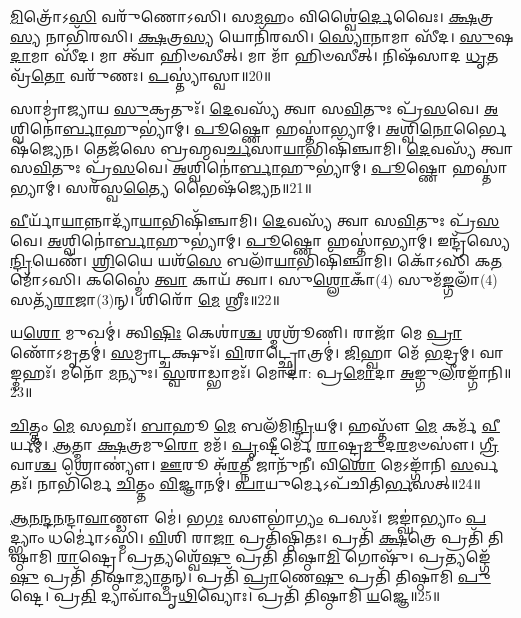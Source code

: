 \-\ul{𑌮𑌿}\-𑌤𑍍𑌰𑍋᳴𑌽\-\ul{𑌸𑌿} 𑌵𑌰𑍁᳴𑌣𑍋𑌽𑌸𑌿।
𑌸\-\ul{𑌮}\-𑌹𑌂 𑌵𑌿𑌶𑍍𑌵𑍈॑\-\ul{𑌰𑍍𑌦𑍇}\-𑌵𑍈𑌃।
\-\ul{𑌕𑍍𑌷}\-𑌤𑍍𑌰\-\ul{𑌸𑍍𑌯} 𑌨𑌾𑌭𑌿᳴𑌰𑌸𑌿।
\-\ul{𑌕𑍍𑌷}\-𑌤𑍍𑌰\-\ul{𑌸𑍍𑌯} 𑌯𑍋𑌨𑌿᳴𑌰𑌸𑌿।
\-\ul{𑌸𑍍𑌯𑍋}\-𑌨𑌾𑌮𑌾 𑌸𑍀᳴𑌦।
\-\ul{𑌸𑍁}\-𑌷\-\ul{𑌦𑌾}\-𑌮𑌾 𑌸𑍀᳴𑌦।
𑌮𑌾 𑌤𑍍𑌵𑌾᳴ 𑌹𑌿𑍞𑌸𑍀𑌤𑍍।
𑌮𑌾 𑌮𑌾᳴ 𑌹𑌿𑍞𑌸𑍀𑌤𑍍।
𑌨𑌿𑌷᳴𑌸𑌾𑌦 \ul{𑌧𑍃}\-𑌤𑌵𑍍𑌰᳴\-\ul{𑌤𑍋} 𑌵𑌰𑍁᳴𑌣𑌃।
\-\ul{𑌪}\-𑌸𑍍𑌤𑍍𑌯𑌾॑𑌸𑍍𑌵𑌾॥20॥

𑌸𑌾𑌮𑍍𑌰𑌾॑𑌜𑍍𑌯𑌾𑌯 \ul{𑌸𑍁}\-𑌕𑍍𑌰𑌤𑍁𑌃᳴।
\-\ul{𑌦𑍇}\-𑌵𑌸𑍍𑌯᳴ 𑌤𑍍𑌵𑌾 𑌸\-\ul{𑌵𑌿}\-𑌤𑍁𑌃 𑌪𑍍𑌰᳴\-\ul{𑌸}\-𑌵𑍇।
\-\ul{𑌅}\-𑌶𑍍𑌵𑌿𑌨𑍋॑\-\ul{𑌰𑍍𑌬𑌾}\-𑌹𑍁𑌭𑍍𑌯𑌾॑𑌮𑍍।
\-\ul{𑌪𑍂}\-𑌷𑍍𑌣𑍋 𑌹𑌸𑍍𑌤𑌾॑𑌭𑍍𑌯𑌾𑌮𑍍।
\-\ul{𑌅}\-𑌶𑍍𑌵𑌿\-\ul{𑌨𑍋}\-𑌰𑍍𑌭𑍈𑌷᳴𑌜𑍍𑌯𑍇𑌨।
𑌤𑍇𑌜᳴𑌸𑍇 𑌬𑍍𑌰𑌹𑍍𑌮𑌵\-\ul{𑌰𑍍𑌚}\-𑌸𑌾\-\ul{𑌯𑌾}\-𑌭𑌿𑌷𑌿᳴𑌞𑍍𑌚𑌾𑌮𑌿।
\-\ul{𑌦𑍇}\-𑌵𑌸𑍍𑌯᳴ 𑌤𑍍𑌵𑌾 𑌸\-\ul{𑌵𑌿}\-𑌤𑍁𑌃 𑌪𑍍𑌰᳴\-\ul{𑌸}\-𑌵𑍇।
\-\ul{𑌅}\-𑌶𑍍𑌵𑌿𑌨𑍋॑\-\ul{𑌰𑍍𑌬𑌾}\-𑌹𑍁𑌭𑍍𑌯𑌾॑𑌮𑍍।
\-\ul{𑌪𑍂}\-𑌷𑍍𑌣𑍋 𑌹𑌸𑍍𑌤𑌾॑𑌭𑍍𑌯𑌾𑌮𑍍।
𑌸𑌰᳴𑌸𑍍𑌵\-\ul{𑌤𑍍𑌯𑍈} 𑌭𑍈𑌷᳴𑌜𑍍𑌯𑍇𑌨॥21॥

\-\ul{𑌵𑍀}\-𑌰𑍍𑌯𑌾᳴\-\ul{𑌯𑌾}\-𑌨𑍍𑌨𑌾𑌦𑍍𑌯𑌾᳴\-\ul{𑌯𑌾}\-𑌭𑌿𑌷𑌿᳴𑌞𑍍𑌚𑌾𑌮𑌿।
\-\ul{𑌦𑍇}\-𑌵𑌸𑍍𑌯᳴ 𑌤𑍍𑌵𑌾 𑌸\-\ul{𑌵𑌿}\-𑌤𑍁𑌃 𑌪𑍍𑌰᳴\-\ul{𑌸}\-𑌵𑍇।
\-\ul{𑌅}\-𑌶𑍍𑌵𑌿𑌨𑍋॑\-\ul{𑌰𑍍𑌬𑌾}\-𑌹𑍁𑌭𑍍𑌯𑌾॑𑌮𑍍।
\-\ul{𑌪𑍂}\-𑌷𑍍𑌣𑍋 𑌹𑌸𑍍𑌤𑌾॑𑌭𑍍𑌯𑌾𑌮𑍍।
𑌇𑌨𑍍𑌦𑍍𑌰᳴𑌸𑍍𑌯𑍇\-\ul{𑌨𑍍𑌦𑍍𑌰𑌿}\-𑌯𑍇𑌣᳴।
\-\ul{𑌶𑍍𑌰𑌿}\-𑌯𑍈 𑌯𑌶᳴\-\ul{𑌸𑍇} 𑌬𑌲𑌾᳴\-\ul{𑌯𑌾}\-𑌭𑌿𑌷𑌿᳴𑌞𑍍𑌚𑌾𑌮𑌿।
𑌕𑍋᳴𑌽𑌸𑌿 𑌕\-\ul{𑌤}\-𑌮𑍋᳴𑌽𑌸𑌿।
𑌕𑌸𑍍𑌮𑍈॑ \ul{𑌤𑍍𑌵𑌾} 𑌕𑌾𑌯᳴ 𑌤𑍍𑌵𑌾।
𑌸𑍁\-\ul{𑌶𑍍𑌲𑍋}\-𑌕𑌾𑌁(4) 𑌸𑍁𑌮᳴\-\ul{𑌙𑍍𑌗}\-𑌲𑌾𑌁(4) 𑌸𑌤𑍍𑌯᳴\-\ul{𑌰𑌾}\-𑌜𑌾(3)𑌨𑍍।
𑌶𑌿𑌰𑍋᳴ \ul{𑌮𑍇} 𑌶𑍍𑌰𑍀𑌃॥22॥

𑌯\-\ul{𑌶𑍋} 𑌮𑍁𑌖𑌮𑍍॑।
𑌤𑍍𑌵𑌿\-\ul{𑌷𑌿𑌃} 𑌕𑍇𑌶𑌾॑\-\ul{𑌶𑍍𑌚} 𑌶𑍍𑌮𑌶𑍍𑌰𑍂᳴𑌣𑌿।
𑌰𑌾𑌜𑌾᳴ 𑌮𑍇 \ul{𑌪𑍍𑌰𑌾}\-𑌣𑍋᳴\-𑌽𑌮𑍃𑌤𑌮𑍍॑।
\-\ul{𑌸}\-𑌮𑍍𑌰𑌾𑌟𑍍𑌚𑌕𑍍𑌷𑍁𑌃᳴।
\-\ul{𑌵𑌿}\-𑌰𑌾𑌟𑍍𑌛𑍍𑌰𑍋𑌤𑍍𑌰𑌮𑍍॑।
\-\ul{𑌜𑌿}\-𑌹𑍍𑌵𑌾 𑌮𑍇᳴ \ul{𑌭}\-𑌦𑍍𑌰𑌮𑍍।
𑌵𑌾𑌙𑍍𑌮𑌹𑌃᳴।
𑌮𑌨𑍋᳴ \ul{𑌮}\-𑌨𑍍𑌯𑍁𑌃।
\-\ul{𑌸𑍍𑌵}\-𑌰𑌾𑌡𑍍𑌭𑌾𑌮𑌃᳴।
𑌮𑍋𑌦𑌾॑: 𑌪𑍍𑌰\-\ul{𑌮𑍋}\-𑌦𑌾 \ul{𑌅}\-𑌙𑍍𑌗𑍁\-\ul{𑌲𑍀}\-𑌰𑌙𑍍𑌗𑌾᳴𑌨𑌿॥23॥

\-\ul{𑌚𑌿}\-𑌤𑍍𑌤𑌂 \ul{𑌮𑍇} 𑌸𑌹𑌃᳴।
\-\ul{𑌬𑌾}\-𑌹𑍂 \ul{𑌮𑍇} 𑌬𑌲᳴𑌮𑌿\-\ul{𑌨𑍍𑌦𑍍𑌰𑌿}\-𑌯𑌮𑍍।
𑌹𑌸𑍍𑌤𑍗᳴ \ul{𑌮𑍇} 𑌕𑌰𑍍𑌮᳴ \ul{𑌵𑍀}\-𑌰𑍍𑌯𑌮𑍍॑।
\-\ul{𑌆}\-𑌤𑍍𑌮𑌾 \ul{𑌕𑍍𑌷}\-𑌤𑍍𑌰𑌮𑍁\-\ul{𑌰𑍋} 𑌮𑌮᳴।
\-\ul{𑌪𑍃}\-𑌷𑍍𑌟𑍀𑌰𑍍𑌮𑍇᳴ \ul{𑌰𑌾}\-𑌷𑍍𑌟𑍍𑌰\-\ul{𑌮𑍁}\-𑌦\-\ul{𑌰}\-𑌮𑍞𑌸𑍗॑।
\-\ul{𑌗𑍍𑌰𑍀}\-𑌵𑌾\-\ul{𑌶𑍍𑌚} 𑌶𑍍𑌰𑍋𑌣𑍍𑌯𑍗॑।
\-\ul{𑌊}\-𑌰𑍂 𑌅᳴\-\ul{𑌰}\-𑌤𑍍𑌨𑍀 𑌜𑌾𑌨𑍁᳴𑌨𑍀।
𑌵𑌿\-\ul{𑌶𑍋} 𑌮𑍇𑌽𑌙𑍍𑌗𑌾᳴𑌨𑌿 \ul{𑌸}\-𑌰𑍍𑌵𑌤𑌃᳴।
𑌨𑌾𑌭𑌿᳴𑌰𑍍𑌮𑍇 \ul{𑌚𑌿}\-𑌤𑍍𑌤𑌂 \ul{𑌵𑌿}\-𑌜𑍍𑌞𑌾𑌨𑌮𑍍॑।
\-\ul{𑌪𑌾}\-𑌯𑍁𑌰𑍍𑌮𑍇\-𑌽𑌪᳴𑌚𑌿𑌤𑌿\-\ul{𑌰𑍍𑌭}\-𑌸𑌤𑍍॥24॥

\-\ul{𑌆}\-\-\ul{𑌨}\-\-\ul{𑌨𑍍𑌦}\-\-\ul{𑌨}\-𑌨𑍍𑌦𑌾\-\ul{𑌵𑌾}\-𑌣𑍍𑌡𑍗 𑌮𑍇॑।
𑌭\-\ul{𑌗𑌃} 𑌸𑍗𑌭𑌾॑\-\ul{𑌗𑍍𑌯𑌂} 𑌪𑌸𑌃᳴।
𑌜𑌙𑍍𑌘𑌾॑𑌭𑍍𑌯𑌾𑌂 \ul{𑌪}\-𑌦𑍍𑌭𑍍𑌯𑌾𑌂 𑌧𑌰𑍍𑌮𑍋॑\-𑌽𑌸𑍍𑌮𑌿।
\-\ul{𑌵𑌿}\-𑌶𑌿 𑌰𑌾\-\ul{𑌜𑌾} 𑌪𑍍𑌰𑌤𑌿᳴\-𑌷𑍍𑌠𑌿𑌤𑌃।
𑌪𑍍𑌰𑌤𑌿᳴ \ul{𑌕𑍍𑌷}\-𑌤𑍍𑌰𑍇 𑌪𑍍𑌰𑌤𑌿᳴ 𑌤𑌿𑌷𑍍𑌠𑌾𑌮𑌿 \ul{𑌰𑌾}\-𑌷𑍍𑌟𑍍𑌰𑍇।
𑌪𑍍𑌰𑌤𑍍𑌯𑌶𑍍𑌵𑍇᳴\-\ul{𑌷𑍁} 𑌪𑍍𑌰𑌤𑌿᳴ 𑌤𑌿𑌷𑍍𑌠𑌾\-\ul{𑌮𑌿} 𑌗𑍋𑌷𑍁᳴।
𑌪𑍍𑌰𑌤𑍍𑌯𑌙𑍍𑌗𑍇᳴\-\ul{𑌷𑍁} 𑌪𑍍𑌰𑌤𑌿᳴ 𑌤𑌿𑌷𑍍𑌠𑌾\-\ul{𑌮𑍍𑌯𑌾}\-𑌤𑍍𑌮𑌨𑍍।
𑌪𑍍𑌰𑌤𑌿᳴ \ul{𑌪𑍍𑌰𑌾}\-𑌣𑍇\-\ul{𑌷𑍁} 𑌪𑍍𑌰𑌤𑌿᳴ 𑌤𑌿𑌷𑍍𑌠𑌾𑌮𑌿 \ul{𑌪𑍁}\-𑌷𑍍𑌟𑍇।
𑌪𑍍𑌰\-\ul{𑌤𑌿} 𑌦𑍍𑌯𑌾𑌵𑌾᳴𑌪𑍃\-\ul{𑌥𑌿}\-𑌵𑍍𑌯𑍋𑌃।
𑌪𑍍𑌰𑌤𑌿᳴ 𑌤𑌿𑌷𑍍𑌠𑌾𑌮𑌿 \ul{𑌯}\-𑌜𑍍𑌞𑍇॥25॥

